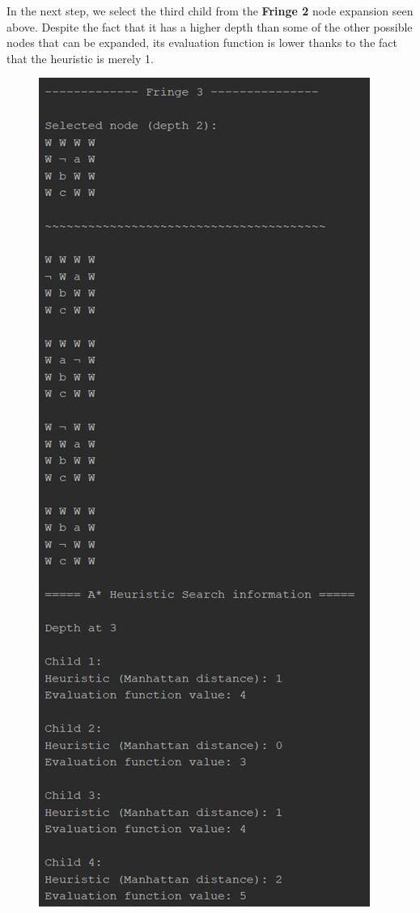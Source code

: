 \documentclass{article}
\begin{document}
	\newpage
	In the next step, we select the third child from the \textbf{Fringe 2} node expansion seen above. Despite the fact that it has a higher depth than some of the other possible nodes that can be expanded, its evaluation function is lower thanks to the fact that the heuristic is merely 1.
	
	\begin{figure}[h]
		\centering
		\includegraphics[height=0.75\textheight]{AStar-1-3.png}
	\end{figure}
\end{document}
